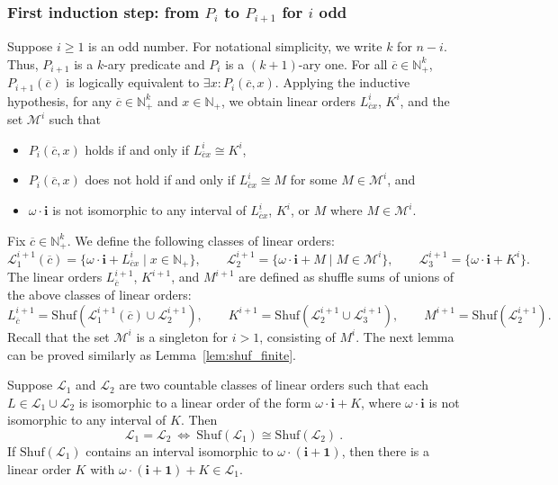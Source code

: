 \documentclass[envcountsame]{llncs}
\renewcommand{\L}{\mathcal L}
\newcommand{\N}{\mathbb N}
\newcommand{\M}{\mathcal M}
\renewcommand{\L}{\mathcal L}
\newcommand{\Shuf}{\mathrm{Shuf}}
\begin{document}
\subsubsection{First induction step: from $P_i$ to $P_{i+1}$ for $i$ odd} 
\label{first-induction-step}

Suppose $i\geq 1$ is an odd number.
For notational simplicity, we write $k$ for $n-i$. Thus, $P_{i+1}$ is a $k$-ary predicate and $P_i$ is a $(k+1)$-ary one. 
For all $\overline{c}\in \N^k_+$, $P_{i+1}(\overline{c})$ is logically equivalent to $\exists x: P_i(\overline{c},x)$.
Applying the inductive hypothesis, for any $\overline{c}\in \N^{k}_+$ and $x\in \N_+$, 
we obtain linear orders $L^i_{\overline{c}x}$, $K^i$, and the set $\M^i$ such that
\begin{itemize}
\item $P_i(\overline{c},x)$ holds if and only if $L^i_{\overline{c}x}\cong K^i$,
\item $P_i(\overline{c},x)$ does not hold if and only if $L^i_{\overline{c}x}
  \cong M$ for some $M\in \M^i$, and
\item $\omega\cdot \mathbf{i}$ is not isomorphic to any interval of $L^i_{\overline{c}x}$, $K^i$, or $M$ where $M\in \M^i$.
\end{itemize}
Fix $\overline{c}\in \N^k_+$. We define the following classes of linear orders:
\begin{equation}\label{eqt:lo_L_i+1}
    \L^{i+1}_1(\overline{c}) = \{ \omega\cdot \mathbf{i} + L^i_{\overline{c}x}\mid x\in \N_+ \}, \qquad
    \L^{i+1}_2 = \{ \omega\cdot \mathbf{i} + M\mid M\in \M^i\},  \qquad
    \L^{i+1}_3 = \{\omega\cdot \mathbf{i} + K^i\} .
\end{equation}
The linear orders $L^{i+1}_{\overline{c}}$, $K^{i+1}$, and $M^{i+1}$ 
are defined as shuffle sums of unions of the above classes of linear orders:
\begin{equation} \label{order-for-i+1}
    L^{i+1}_{\overline{c}} = \Shuf(\L^{i+1}_1(\overline{c})\cup \L^{i+1}_2), 
\qquad  K^{i+1} = \Shuf( \L^{i+1}_2 \cup \L^{i+1}_3), \qquad M^{i+1} = \Shuf(\L^{i+1}_2).
\end{equation}
Recall that the set $\M^i$ is a singleton for $i > 1$, consisting of
$M^i$.  The next lemma can be proved similarly as
Lemma~\ref{lem:shuf_finite}.

\begin{lemma}\label{lem:shuf_inf}
  Suppose $\L_1$ and $\L_2$ are two countable classes of linear orders
  such that each $L\in \L_1\cup \L_2$ is isomorphic to a linear order
  of the form $\omega\cdot \mathbf{i} + K$, where $\omega\cdot
  \mathbf{i}$ is not isomorphic to any interval of $K$. Then
  \[
      \L_1=\L_2 \ \Longleftrightarrow \ \Shuf(\L_1)\cong \Shuf(\L_2)\ .
  \]
  If $\Shuf(\L_1)$ contains an interval isomorphic to
  $\omega\cdot(\mathbf{i+1})$, then there is a linear order $K$ with
  $\omega\cdot(\mathbf{i+1})+K\in\L_1$.
\end{lemma}
\end{document}
